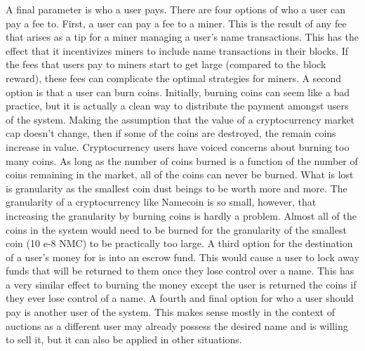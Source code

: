     A final parameter is who a user pays. There are four options of who a user can pay a fee to. First, a user can pay a fee to a miner. This is the result of any fee that arises as a tip for a miner managing a user's name transactions. This has the effect that it incentivizes miners to include name transactions in their blocks. If the fees that users pay to miners start to get large (compared to the block reward), these fees can complicate the optimal strategies for miners. A second option is that a user can burn coins. Initially, burning coins can seem like a bad practice, but it is actually a clean way to distribute the payment amongst users of the system. Making the assumption that the value of a cryptocurrency market cap doesn't change, then if some of the coins are destroyed, the remain coins increase in value.  Cryptocurrency users have voiced concerns about burning too many coins. As long as the number of coins burned is a function of the number of coins remaining in the market, all of the coins can never be burned. What is lost is granularity as the smallest coin dust beings to be worth more and more. The granularity of a cryptocurrency like Namecoin is so small, however, that increasing the granularity by burning coins is hardly a problem. Almost all of the coins in the system would need to be burned for the granularity of the smallest coin (10 e-8 NMC) to be practically too large. A third option for the destination of a user's money for is into an escrow fund. This would cause a user to lock away funds that will be returned to them once they lose control over a name. This has a very similar effect to burning the money except the user is returned the coins if they ever lose control of a name. A fourth and final option for who a user should pay is another user of the system. This makes sense mostly in the context of auctions as a different user may already possess the desired name and is willing to sell it, but it can also be applied in other situations.


